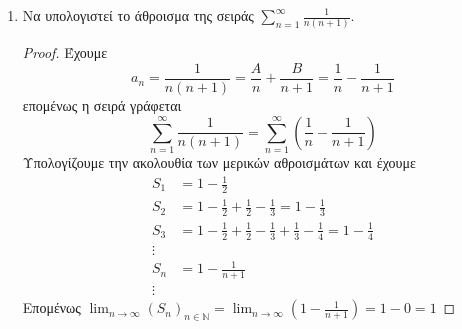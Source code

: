 \documentclass[main.tex]{subfiles}
\begin{document}
\begin{examples}
\item {}
    \begin{enumerate}
        \item Να υπολογιστεί το άθροισμα της σειράς $ \sum_{n=1}^{\infty} 
            \frac{1}{n(n+1)} $.
            \begin{proof}
                Έχουμε
                \[
                    a_{n} = \frac{1}{n(n+1)} = \frac{A}{n} + \frac{B}{n+1} = 
                    \frac{1}{n} - \frac{1}{n+1} 
                \]
                επομένως η σειρά γράφεται
                \[
                    \sum_{n=1}^{\infty} \frac{1}{n(n+1)} = 
                    \sum_{n=1}^{\infty} \left(\frac{1}{n} - \frac{1}{n+1}\right) 
                \] 
                Υπολογίζουμε την ακολουθία των μερικών αθροισμάτων και έχουμε
                \begin{align*}
                    S_{1} &= 1- \frac{1}{2} \\
                    S_{2} &= 1- \frac{1}{2} + \frac{1}{2} - \frac{1}{3} = 
                    1 - \frac{1}{3}  \\
                    S_{3} &=  1- \frac{1}{2} + \frac{1}{2} - \frac{1}{3} + 
                    \frac{1}{3} - \frac{1}{4} = 1 - \frac{1}{4}  \\
                    \vdots \\
                    S_{n} &= 1 - \frac{1}{n+1} \\
                    \vdots
                \end{align*}
                Επομένως $ \lim_{n \to \infty} {(S_{n})}_{n \in \mathbb{N}} = 
                \lim_{n \to \infty} \left(1 - \frac{1}{n+1}\right) = 1 - 0 = 1 $
            \end{proof}


\end{enumerate}
\end{examples}
\end{document}
